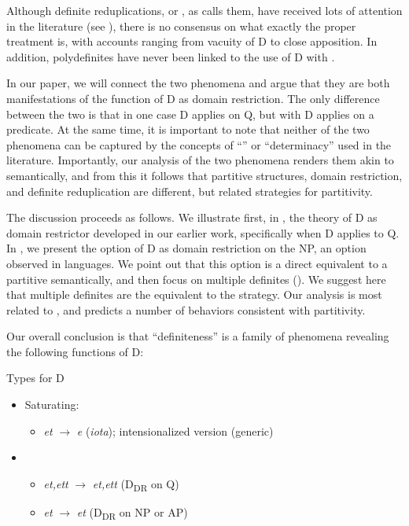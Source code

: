 \documentclass[output=paper,
modfonts
]{langscibook}
\begin{document}
Although  definite reduplications, or , as \citet{kolliakou2004} calls them, have received lots of attention in the literature (see \citealt{AlexiadouWilder1998b, CamposStravrou2004, kolliakou2004, ioannidou-dendikken2006, lekakou-szendroi2007}), there is no consensus on what exactly the proper treatment is, with accounts ranging from vacuity of D to close apposition. In addition, polydefinites have never been linked to the use of D with . 

In our paper, we will connect the two phenomena and argue that they are both manifestations of the function of D as domain restriction. The only difference between the two is that in one case D applies on Q, but with  D applies on a predicate. At the same time, it is important to note that neither of the two phenomena can be captured by the concepts of ``'' or ``determinacy'' \citep{CoppockBeaver2015} used in the literature. Importantly, our analysis of the two phenomena renders them akin to  semantically, and from this it follows that partitive structures, domain restriction, and definite reduplication are different, but related strategies for partitivity. 

The discussion proceeds as follows. We illustrate first, in , the theory of D as domain restrictor developed in our earlier work, specifically when D applies to Q. In , we present the option of D as domain restriction on the NP, an option observed in  languages. We point out that this option is a direct equivalent to a partitive semantically, and then focus on multiple definites (). We suggest here that multiple definites are the  equivalent to the  strategy. Our analysis is most related to \citet{kolliakou2004}, and predicts a number of behaviors consistent with partitivity.

Our overall conclusion is that ``definiteness'' is a family of phenomena revealing the following functions of D: 

\ea\label{ex:etxeberria:15}
{Types for D}
\begin{itemize}
	\item {Saturating:} 
	\begin{itemize}
		\item \textit{et} $\rightarrow$ \textit{e} (\textit{iota}); intensionalized version (generic)
	\end{itemize} \newpage 
	\item {}
	\begin{itemize}
		\item \textit{et,ett} $\rightarrow$ \textit{et,ett} (D\textsubscript{DR} on Q)
		\item \textit{et} $\rightarrow$ \textit{et} (D\textsubscript{DR} on NP or AP)
	\end{itemize}
\end{itemize}
\z
\end{document}
